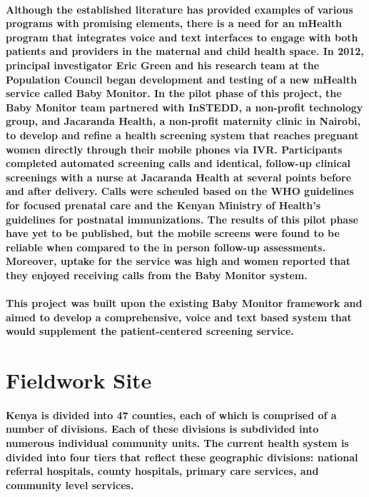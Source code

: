 \paragraph{Although the established literature has provided examples of various programs with promising elements, there is a need for an mHealth program that integrates voice and text interfaces to engage with both patients and providers in the maternal and child health space. In 2012, principal investigator Eric Green and his research team at the Population Council began development and testing of a new mHealth service called Baby Monitor. In the pilot phase of this project, the Baby Monitor team partnered with InSTEDD, a non-profit technology group, and Jacaranda Health, a non-profit maternity clinic in Nairobi, to develop and refine a health screening system that reaches pregnant women directly through their mobile phones via IVR. Participants completed automated screening calls and identical, follow-up clinical screenings with a nurse at Jacaranda Health at several points before and after delivery. Calls were scheuled based on the WHO guidelines for focused prenatal care and the Kenyan Ministry of Health's guidelines for postnatal immunizations. The results of this pilot phase have yet to be published, but the mobile screens were found to be reliable when compared to the in person follow-up assessments. Moreover, uptake for the service was high and women reported that they enjoyed receiving calls from the Baby Monitor system.}

\paragraph{This project was built upon the existing Baby Monitor framework and aimed to develop a comprehensive, voice and text based system that would supplement the patient-centered screening service.}


\section{Fieldwork Site}

\paragraph{Kenya is divided into 47 counties, each of which is comprised of a number of divisions. Each of these divisions is subdivided into numerous individual community units. The current health system is divided into four tiers that reflect these geographic divisions: national referral hospitals, county hospitals, primary care services, and community level services. \citep{SPA2010}}

